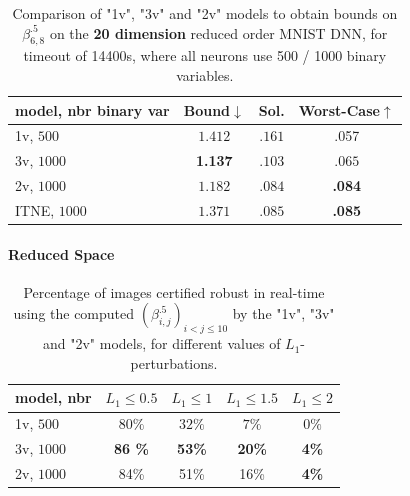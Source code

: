 \begin{table}[b!]
	\centering
	\begin{tabular}{||l||c|c|c||}\hline\hline
		model, nbr binary var &        Bound$\downarrow$ &  Sol. &      Worst-Case$\uparrow$ \\\hline \hline
	 

1v, $500$ & $1.412$ & $.161$ & .057 \\\hline 
3v, $1000$ & {\bf 1.137} & $.103$ & $.065$\\\hline 
2v, $1000$ &  $1.182$ & $.084$& {\bf .084}  \\\hline
ITNE, $1000$ &  $1.371$ & $.085$& {\bf .085}  \\\hline\hline
	 
	\end{tabular}
	\caption{Comparison of "1v", "3v" and "2v" models 
	to obtain bounds on $\beta^{.5}_{6,8}$ on the {\bf 20 dimension} reduced order MNIST DNN, for timeout of 14400s, where 
	all %
	neurons use 500 / 1000 binary variables.}
	\label{table.reduced}
\end{table}


\paragraph{Reduced Space}



\begin{table}[b!]
	\begin{tabular}{||l||c|c|c|c||}\hline\hline
		model, nbr &    $L_1\leq 0.5$ & $L_1\leq 1$ & $L_1\leq 1.5$ &  $L_1\leq 2$ \\\hline \hline
		1v, $500$ & $80 \%$ & $32\%$ & $7\%$ & $0\%$ \\\hline
		3v, $1000$ & {\bf 86 \%} & {\bf 53\%} & {\bf 20\%} & {\bf 4\%} \\\hline
		2v, $1000$ & 84\% & 51\% & 16\% & {\bf 4\%} \\\hline \hline
	\end{tabular}
	\caption{Percentage of images certified robust in real-time 
	using the computed $(\beta^{.5}_{i,j})_{i < j \leq 10}$ 
	by the "1v", "3v" and "2v" models, for different values of $L_1$-perturbations.}
    \label{table.cert}
\end{table}


